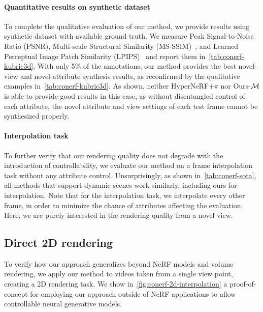     \paragraph{Quantitative results on synthetic dataset}
      To complete the qualitative evaluation of our method, we provide results using
      synthetic dataset with available ground truth.
      We measure Peak Signal-to-Noise Ratio (PSNR), Multi-scale Structural
      Similarity (MS-SSIM)~\cite{wang2003multiscale}, and Learned Perceptual Image
      Patch Similarity (LPIPS)~\cite{zhang2018unreasonable} and report them
      in~\cref{tab:conerf-kubric3d}.
      With only 5\% of the annotations, our method provides the best novel-view and
      novel-attribute synthesis results, as reconfirmed by the qualitative examples
      in~\cref{tab:conerf-kubric3d}.
      As shown, neither HyperNeRF{+}$\pi$ nor Ours{-}$\mathcal{M}$ is able to provide
      good results in this case, as without disentangled control of each attribute,
      the novel attribute and view settings of each test frame cannot be synthesized
      properly.

    \paragraph{Interpolation task}
      To further verify that our rendering quality does not degrade with the
      introduction of controllability, we evaluate our method on a frame
      interpolation task without any attribute control.
      Unsurprisingly, as shown in~\cref{tab:conerf-sota}, all methods that support
      dynamic scenes work similarly, including ours for interpolation.
      Note that for the interpolation task, we interpolate every other frame, in
      order to minimize the chance of attributes affecting the evaluation.
      Here, we are purely interested in the rendering quality from a novel view.

      

      
  \subsection{Direct 2D rendering}
    To verify how our approach generalizes beyond NeRF models and volume
    rendering, we apply our method to videos taken from a single view point,
    creating a 2D rendering task.
    We show in~\cref{fig:conerf-2d-interpolation} a proof-of-concept for employing
    our approach outside of NeRF applications to allow controllable neural
    generative models.

